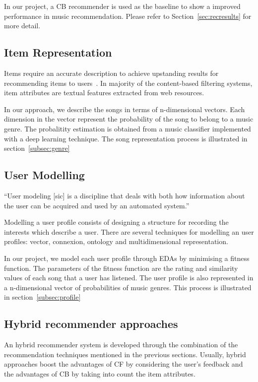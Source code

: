 In our project, a CB recommender is used as the baseline to show a improved performance in music recommendation. Please refer to Section~\ref{sec:recresults} for more detail.

\subsection{Item Representation}
Items require an accurate description to achieve upstanding results for recommending items to users~\Autocite{1242}. In majority of the content-based filtering systems, item attributes are textual features extracted from web resources.~\parencite{Lops2011}

In our approach, we describe the songs in terms of n-dimensional vectors. Each dimension in the vector represent the probability of the song to belong to a music genre. The probalitity estimation is obtained from a music classifier implemented with a deep learning technique. The song representation process is illustrated in section~\ref{subsec:genre}

\subsection{User Modelling}
``User modeling [sic] is a discipline that deals with both how information about the user can be acquired and used by an automated system.''~\parencite{recsys2012}

Modelling a user profile consists of designing a structure for recording the interests which describe a user. There are several techniques for modelling an user profiles: vector, connexion, ontology and multidimensional representation. \parencite{DBLP:journals/corr/abs-1305-1114}

In our project, we model each user profile through EDAs by minimising a fitness function. The parameters of the fitness function are the rating and similarity values of each song that a user has listened. The user profile is also represented in a n-dimensional vector of probabilities of music genres. This process is illustrated in section~\ref{subsec:profile}

\subsection{Hybrid recommender approaches}
\label{subsec:hybridrecommender}
An hybrid recommender system is developed through the combination of the recommendation techniques mentioned in the previous sections. Usually, hybrid approaches boost the advantages of CF by considering the user's feedback and the advantages of CB by taking into count the item attributes.

